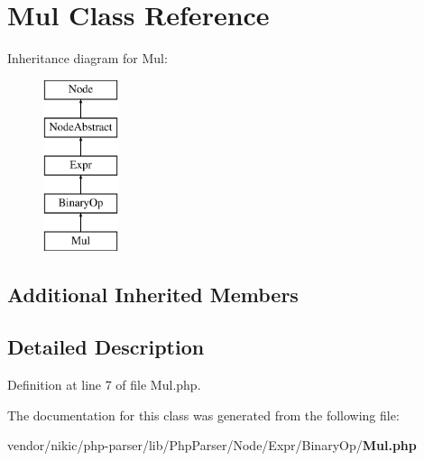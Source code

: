 \section{Mul Class Reference}
\label{class_php_parser_1_1_node_1_1_expr_1_1_binary_op_1_1_mul}
Inheritance diagram for Mul\+:\begin{figure}[H]
\begin{center}
\leavevmode
\includegraphics[height=5.000000cm]{class_php_parser_1_1_node_1_1_expr_1_1_binary_op_1_1_mul}
\end{center}
\end{figure}
\subsection*{Additional Inherited Members}


\subsection{Detailed Description}


Definition at line 7 of file Mul.\+php.



The documentation for this class was generated from the following file\+:\begin{DoxyCompactItemize}
\item 
vendor/nikic/php-\/parser/lib/\+Php\+Parser/\+Node/\+Expr/\+Binary\+Op/{\bf Mul.\+php}\end{DoxyCompactItemize}
